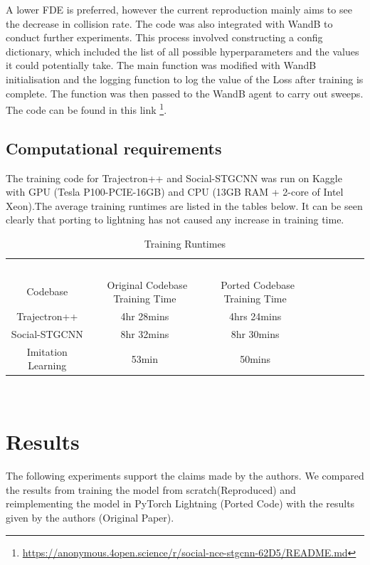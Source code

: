 {A lower FDE is preferred, however the current reproduction mainly aims to see the decrease in collision rate. 
The code was also integrated with WandB to conduct further experiments. This process involved constructing a config dictionary, which included the list of all possible hyperparameters and the values it could potentially take. The main function was modified with WandB initialisation and the logging function to log the value of the Loss after training is complete. The function was then passed to the WandB agent to carry out sweeps. The code can be found in this link \footnote{\href{https://anonymous.4open.science/r/social-nce-stgcnn-62D5/README.md}{https://anonymous.4open.science/r/social-nce-stgcnn-62D5/README.md}}.
\subsection{Computational requirements}
The training code for Trajectron++ and Social-STGCNN was run on Kaggle with GPU (Tesla P100-PCIE-16GB) and CPU (13GB RAM + 2-core of Intel Xeon).The average training runtimes are listed in the tables below. It can be seen clearly that porting to lightning has not caused any increase in training time. 

\begin{table}[H]
\caption{Training Runtimes} %
\centering %
\begin{tabular}{ccc rrrrr} 
\hline 
&\ \ \ \ \ \\
Codebase&\ Original Codebase Training Time&\ Ported Codebase Training Time&\ \\ [0.5ex]
\hline 
Trajectron++ &    4hr 28mins & 4hrs 24mins\\
Social-STGCNN &  8hr 32mins & 8hr 30mins\\
Imitation Learning &   53min & 50mins\\
\hline %
\end{tabular}
\label{tab:hresult}
\end{table}
\\

\section{Results}
\label{sec:results}
The following experiments support the claims made by the authors. We compared the results from training the model from scratch(Reproduced) and reimplementing the model in PyTorch Lightning (Ported Code) with the results given by the authors (Original Paper).

}
